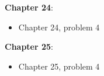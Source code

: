 \documentclass[12pt]{extarticle}
\begin{document}
\noindent \textbf{Chapter 24}:
\begin{itemize}
  \item Chapter 24, problem 4
\end{itemize}

\noindent \textbf{Chapter 25}:
\begin{itemize}
  \item Chapter 25, problem 4
\end{itemize}




\end{document}
